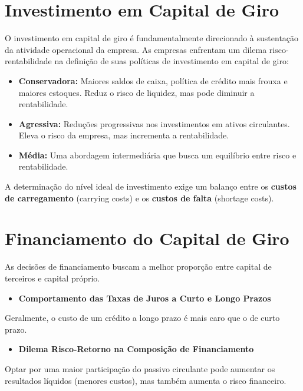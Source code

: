 \documentclass[
  a4paper,
]{book}
\providecommand{\tightlist}{%
  \setlength{\itemsep}{0pt}\setlength{\parskip}{0pt}}\usepackage{longtable,booktabs,array}
\begin{document}
\section{Investimento em Capital de
Giro}\label{investimento-em-capital-de-giro}

O investimento em capital de giro é fundamentalmente direcionado à
sustentação da atividade operacional da empresa. As empresas enfrentam
um dilema risco-rentabilidade na definição de suas políticas de
investimento em capital de giro:

\begin{itemize}
\tightlist
\item
  \textbf{Conservadora:} Maiores saldos de caixa, política de crédito
  mais frouxa e maiores estoques. Reduz o risco de liquidez, mas pode
  diminuir a rentabilidade.
\item
  \textbf{Agressiva:} Reduções progressivas nos investimentos em ativos
  circulantes. Eleva o risco da empresa, mas incrementa a rentabilidade.
\item
  \textbf{Média:} Uma abordagem intermediária que busca um equilíbrio
  entre risco e rentabilidade.
\end{itemize}

A determinação do nível ideal de investimento exige um balanço entre os
\textbf{custos de carregamento} (carrying costs) e os \textbf{custos de
falta} (shortage costs).

\section{Financiamento do Capital de
Giro}\label{financiamento-do-capital-de-giro}

As decisões de financiamento buscam a melhor proporção entre capital de
terceiros e capital próprio.

\begin{itemize}
\tightlist
\item
  \textbf{Comportamento das Taxas de Juros a Curto e Longo Prazos}
\end{itemize}

Geralmente, o custo de um crédito a longo prazo é mais caro que o de
curto prazo.

\begin{itemize}
\tightlist
\item
  \textbf{Dilema Risco-Retorno na Composição de Financiamento}
\end{itemize}

Optar por uma maior participação do passivo circulante pode aumentar os
resultados líquidos (menores custos), mas também aumenta o risco
financeiro.
\end{document}
